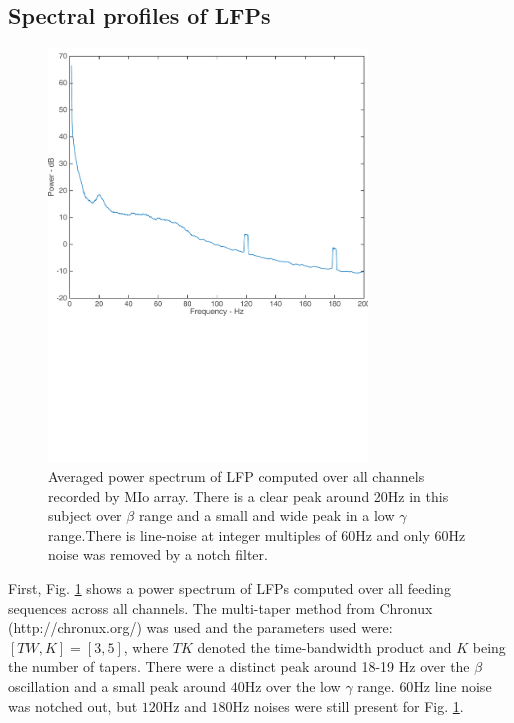 \documentclass[letterpaper, 9pt, conference]{ieeeconf}
\begin{document}
\subsection{Spectral profiles of LFPs}
\begin{figure}[ht!]
\begin{minipage}{20pc}
\includegraphics[width=20pc]{PSD_v1.pdf}
 \vspace{-1.5in}
\caption{\label{fig:psd}Averaged power spectrum of LFP computed over all channels recorded by MIo array. There is a clear peak around 20Hz in this subject over $\beta$ range and a small and wide peak in a low $\gamma$ range.There is line-noise at integer multiples of 60Hz and only 60Hz noise was removed by a notch filter.}
\end{minipage}\hspace{2pc}
\end{figure}

First, Fig. \ref{fig:psd} shows a power spectrum of LFPs computed over all feeding sequences across all channels. The multi-taper method from Chronux (http://chronux.org/) \cite{Mitra2008} was used and the parameters used were: $[TW, K]=[3, 5]$, where $TK$ denoted the time-bandwidth product and $K$ being the number of tapers. There were a distinct peak around 18-19 Hz over the $\beta$ oscillation and a small peak around $40$Hz over the low $\gamma$ range. $60$Hz line noise was notched out, but $120$Hz and $180$Hz noises were still present for Fig. \ref{fig:psd}. 
\end{document}
